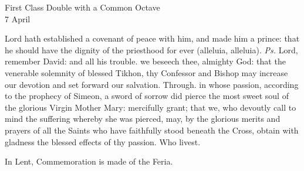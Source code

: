 \begin{inhead}
    {First Class Double with a Common Octave\\
7 April}
\end{inhead}
\par\noindent
{}


{}
 Lord hath established a covenant of peace with him, and made him a prince: that he should have the dignity of the priesthood for ever (alleluia, alleluia). \textit{Ps.} Lord, remember David: and all his trouble.
\collect
 we beseech thee, almighty God: that the venerable solemnity of blessed Tikhon, thy Confessor and Bishop may increase our devotion and set forward our salvation. Through.
 in whose passion, according to the prophecy of Simeon, a sword of sorrow did pierce the most sweet soul of the glorious Virgin Mother Mary: mercifully grant; that we, who devoutly call to mind the suffering whereby she was pierced, may, by the glorious merits and prayers of all the Saints who have faithfully stood beneath the Cross, obtain with gladness the blessed effects of thy passion. Who livest.
\begin{rubric}
    In Lent, Commemoration is made of the Feria.%
\end{rubric}
